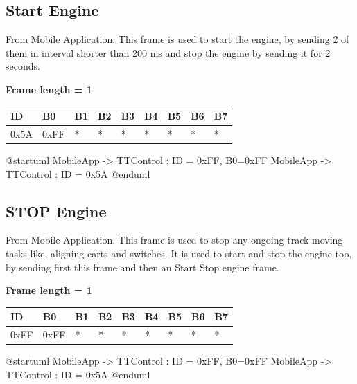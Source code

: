 \documentclass{article}
\begin{document}
\subsection{Start Engine}
From Mobile Application. This frame is used to start the engine, by sending 2 of them in interval shorter than 200 ms and stop the engine by sending it for 2 seconds.

\textbf{Frame length = 1}
\begin{center}
    \begin{tabular}{| p{20pt} | p{40pt} | p{40pt} | p{40pt} | p{40pt} | p{40pt} | p{40pt} | p{40pt} | p{40pt} |}
        \hline
        ID   & B0   & B1 & B2 & B3 & B4 & B5 & B6 & B7 \\
        \hline
        0x5A & 0xFF & *  & *  & *  & *  & *  & *  & *  \\
        \hline
    \end{tabular}
\end{center}

\begin{plantuml}
    @startuml
    MobileApp -> TTControl : ID = 0xFF, B0=0xFF
    MobileApp -> TTControl : ID = 0x5A
    @enduml
\end{plantuml}


\subsection{STOP Engine}
From Mobile Application. This frame is used to stop any ongoing track moving tasks like, aligning carts and switches. It is used to start and stop the engine too, by sending first this frame and then an Start Stop engine frame.

\textbf{Frame length = 1 }
\begin{center}
    \begin{tabular}{| p{20pt} | p{40pt} | p{40pt} | p{40pt} | p{40pt} | p{40pt} | p{40pt} | p{40pt} | p{40pt} |}
        \hline
        ID   & B0   & B1 & B2 & B3 & B4 & B5 & B6 & B7 \\
        \hline
        0xFF & 0xFF & *  & *  & *  & *  & *  & *  & *  \\
        \hline
    \end{tabular}
\end{center}

\begin{plantuml}
    @startuml
    MobileApp -> TTControl : ID = 0xFF, B0=0xFF
    MobileApp -> TTControl : ID = 0x5A
    @enduml
\end{plantuml}
\end{document}
